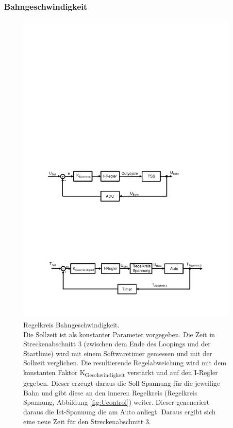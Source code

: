 \documentclass[a4paper, 11pt]{report}
\begin{document}
		\subsubsection{Bahngeschwindigkeit}\label{subsubsec:Tcontrol}
			\begin{figure}[ht]
				\centering
				\includegraphics[width=\textwidth]{rec/Tcontrol.pdf}
				\caption[Regelkreis Bahngeschwindigkeit]{Regelkreis Bahngeschwindigkeit.\\
				Die Sollzeit ist als konstanter Parameter vorgegeben.
				Die Zeit in Streckenabschnitt 3 (zwischen dem Ende des Loopings und der Startlinie) wird mit einem Softwaretimer gemessen und mit der Sollzeit verglichen.
				Die resultierende Regelabweichung wird mit dem konstanten Faktor K\textsubscript{Geschwindigkeit} verstärkt und auf den I-Regler gegeben.
				Dieser erzeugt daraus die Soll-Spannung für die jeweilige Bahn und gibt diese an den inneren Regelkreis (Regelkreis Spannung, Abbildung \ref{fig:Ucontrol}) weiter.
				Dieser geneneriert daraus die Ist-Spannung die am Auto anliegt. Daraus ergibt sich eine neue Zeit für den Streckenabschnitt 3.}
				\label{fig:Tcontrol}
			\end{figure}
\end{document}

